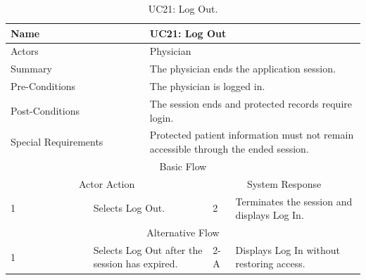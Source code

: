 \begin{table}[htbp]
\centering
\small
\caption{UC21: Log Out.}
\label{tab:kashaf:uc21}
\begin{tabular}{|p{}|p{}|p{}|p{}|p{}|}
\hline
\multicolumn{2}{|p{\dimexpr0.225\textwidth+2\tabcolsep+\arrayrulewidth\relax}|}{Name} & \multicolumn{3}{p{\dimexpr0.575\textwidth+4\tabcolsep+2\arrayrulewidth\relax}|}{UC21: Log Out} \\ \hline
\multicolumn{2}{|p{\dimexpr0.225\textwidth+2\tabcolsep+\arrayrulewidth\relax}|}{Actors} & \multicolumn{3}{p{\dimexpr0.575\textwidth+4\tabcolsep+2\arrayrulewidth\relax}|}{Physician} \\ \hline
\multicolumn{2}{|p{\dimexpr0.225\textwidth+2\tabcolsep+\arrayrulewidth\relax}|}{Summary} & \multicolumn{3}{p{\dimexpr0.575\textwidth+4\tabcolsep+2\arrayrulewidth\relax}|}{The physician ends the application session.} \\ \hline
\multicolumn{2}{|p{\dimexpr0.225\textwidth+2\tabcolsep+\arrayrulewidth\relax}|}{Pre-Conditions} & \multicolumn{3}{p{\dimexpr0.575\textwidth+4\tabcolsep+2\arrayrulewidth\relax}|}{The physician is logged in.} \\ \hline
\multicolumn{2}{|p{\dimexpr0.225\textwidth+2\tabcolsep+\arrayrulewidth\relax}|}{Post-Conditions} & \multicolumn{3}{p{\dimexpr0.575\textwidth+4\tabcolsep+2\arrayrulewidth\relax}|}{The session ends and protected records require login.} \\ \hline
\multicolumn{2}{|p{\dimexpr0.225\textwidth+2\tabcolsep+\arrayrulewidth\relax}|}{Special Requirements} & \multicolumn{3}{p{\dimexpr0.575\textwidth+4\tabcolsep+2\arrayrulewidth\relax}|}{Protected patient information must not remain accessible through the ended session.} \\ \hline
\multicolumn{5}{|c|}{Basic Flow} \\ \hline
\multicolumn{3}{|c|}{Actor Action} & \multicolumn{2}{c|}{System Response} \\ \hline
1 & \multicolumn{2}{p{\dimexpr0.37\textwidth+2\tabcolsep+\arrayrulewidth\relax}|}{Selects Log Out.} & 2 & Terminates the session and displays Log In. \\ \hline
\multicolumn{5}{|c|}{Alternative Flow} \\ \hline
1 & \multicolumn{2}{p{\dimexpr0.37\textwidth+2\tabcolsep+\arrayrulewidth\relax}|}{Selects Log Out after the session has expired.} & 2-A & Displays Log In without restoring access. \\ \hline
\end{tabular}
\end{table}


